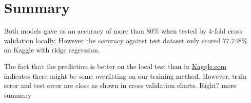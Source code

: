 \documentclass[10pt,conference,compsocconf]{IEEEtran}
\begin{document}







\section{Summary}
Both models gave us an accuracy of more than $80\%$ when tested by 4-fold cross validation locally. However the accuracy against test dataset only scored $77.748\%$ on Kaggle with ridge regression.

The fact that the prediction is better on the local test than in {\color{blue}\href{https://www.kaggle.com}{Kaggle.com}} indicates there might be some overfitting on our training method. {\color{red}However, train error and test error are close as shown in cross validation charts. Right?} more summary




\end{document}
